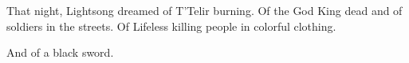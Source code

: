 \chapter{}

That night, Lightsong dreamed of T’Telir burning. Of the God King dead and of soldiers in the streets. Of Lifeless killing people in colorful clothing.

And of a black sword.

